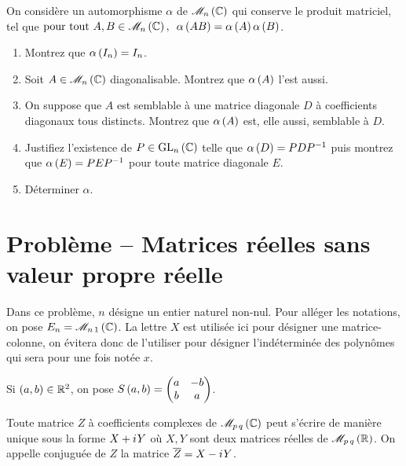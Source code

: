 \begin{exo}
On considère un automorphisme \(\alpha\) de \(\M{n}[\C]\) qui conserve le produit matriciel, \cad tel que \(\quantifs{\tpt A,B\in\M{n}[\C]}\alpha\paren{AB}=\alpha\paren{A}\alpha\paren{B}\).

\begin{enumerate}
    \item Montrez que \(\alpha\left(I_n\right)=I_n\). \\
    \item Soit \(A\in\M{n}[\C]\) diagonalisable. Montrez que \(\alpha\left(A\right)\) l'est aussi. \\
    \item On suppose que \(A\) est semblable à une matrice diagonale \(D\) à coefficients diagonaux tous distincts. Montrez que \(\alpha\left(A\right)\) est, elle aussi, semblable à \(D\). \\
    \item Justifiez l'existence de \(P\in\GL{n}[\C]\) telle que \(\alpha\left(D\right)=PDP^{-1}\) puis montrez que \(\alpha\left(E\right)=PEP^{-1}\) pour toute matrice diagonale \(E\). \\
    \item Déterminer \(\alpha\).
\end{enumerate}
\end{exo}



\section*{Problème -- Matrices réelles sans valeur propre réelle}

Dans ce problème, \(n\) désigne un entier naturel non-nul. Pour alléger les notations, on pose \(E_n=\M{n\,1}[\C]\). La lettre \(X\) est utilisée ici pour désigner une matrice-colonne, on évitera donc de l'utiliser pour désigner l'indéterminée des polynômes qui sera pour une fois notée \(x\).

Si \(\left(a,b\right)\in\mathbb{R}^2\), on pose \(S\left(a,b\right)=\begin{pmatrix}
a & -b \\
b & a
\end{pmatrix}\).

Toute matrice \(Z\) à coefficients complexes de \(\M{p\,q}[\C]\) peut s'écrire de manière unique sous la forme \(X+i\mkern1mu Y\) où \(X,Y\) sont deux matrices réelles de \(\M{p\,q}[\R]\). On appelle conjuguée de \(Z\) la matrice \(\overline{Z}=X-i\mkern1mu Y\).

